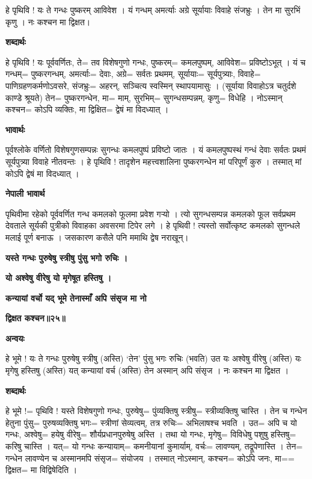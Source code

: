 \documentclass[11pt, a5paper]{article}
\begin{document}
हे पृथिवि ! यः ते गन्धः पुष्करम् आविवेश । यं गन्धम् अमर्त्याः अग्रे सूर्यायाः विवाहे संजभ्रुः । तेन मा सुरभिं कृणु । नः कश्चन मा द्विक्षत।

\textbf{शब्दार्थः}

हे पृथिवि ! यः पूर्ववर्णितः, ते= तव विशेषगुणो गन्धः, पुष्करम्= कमलपुष्पम्, आविवेश= प्रविष्टोऽभूत् । यं च गन्धम्= पुष्करगन्धम्, अमर्त्याः= देवाः, अग्रे= सर्वतः प्रथमम्, सूर्यायाः= सूर्यपुत्र्याः, विवाहे= पाणिग्रहणकर्मणोऽवसरे, संजभ्रुः= अहरन्, सञ्चित्य स्वस्मिन् स्थापयामासुः । (सूर्याया विवाहोऽत्र चतुर्दशे काण्डे श्रूयते) तेन= पुष्करगन्धेन, मा= माम्, सुरभिम्= सुगन्धसम्पन्नम्, कृणु= विधेहि । नोऽस्मान् कश्चन= कोऽपि व्यक्तिः, मा द्विक्षित= द्वेषं मा विदध्यात् ।

\textbf{भावार्थः}

पूर्वश्लोके वर्णितो विशेषगुणसम्पन्नः सुगन्धः कमलपुष्पं प्रविष्टो जातः । यं कमलपुष्पस्थं गन्धं देवाः सर्वतः प्रथमं सूर्यपुत्र्या विवाहे नीतवन्तः । हे पृथिवि ! तादृशेन महत्त्वशालिना पुष्करगन्धेन मां परिपूर्णं कुरु । तस्मात् मां कोऽपि द्वेषं मा विदध्यात् ।

\textbf{नेपाली भावार्थ}

पृथिवीमा रहेको पूर्ववर्णित गन्ध कमलको फूलमा प्रवेश गर्‍यो । त्यो सुगन्धसम्पन्न कमलको फूल सर्वप्रथम देवताले सूर्यकी पुत्रीको विवाहका अवसरमा टिपेर लगे । हे पृथिवी ! त्यस्तो सर्वोत्कृष्ट कमलको सुगन्धले मलाई पूर्ण बनाऊ । जसकारण कसैले पनि ममाथि द्वेष नराखून्।

\textbf{यस्ते गन्धः पुरुषेषु स्त्रीषु पुंसु भगो रुचिः ।}

\textbf{यो अश्वेषु वीरेषु यो मृगेषूत हस्तिषु ।}

\textbf{कन्यायां वर्चो यद् भूमे तेनास्माँ अपि संसृज मा नो}

\textbf{द्विक्षत कश्चन॥२५॥}

\textbf{अन्वयः}

हे भूमे ! यः ते गन्धः पुरुषेषु स्त्रीषु (अस्ति) ‘तेन’ पुंसु भगः रुचिः (भवति)  उत यः अश्वेषु वीरेषु (अस्ति) यः मृगेषु हस्तिषु (अस्ति) यत् कन्यायां वर्च (अस्ति) तेन अस्मान् अपि संसृज । नः कश्चन मा द्विक्षत ।

\textbf{शब्दार्थः}

हे भूमे !‍= पृथिवि ! यस्ते विशेषगुणो गन्धः, पुरुषेषु= पुंव्यक्तिषु स्त्रीषु= स्त्रीव्यक्तिषु चास्ति । तेन च गन्धेन हेतुना पुंसु= पुरुषव्यक्तिषु भगः= स्त्रीणां सेव्यत्वम्, तत्र रुचिः= अभिलाषश्च भवति । उत= अपि च यो गन्धः, अश्वेषु= हयेषु वीरेषु= शौर्यप्रधानपुरुषेषु अस्ति । तथा यो गन्धः, मृगेषु= विविधेषु पशुषु हस्तिषु= करिषु चास्ति । यत्= यो गन्धः कन्यायाम्= कमनीयानां कुमार्याम्, वर्चः= लावण्यम्, तद्रूपेणास्ति । तेन= गन्धेन लावण्येन च अस्मानमपि संसृज= संयोजय । तस्मात् नोऽस्मान्, कश्चन= कोऽपि जनः, मा== द्विक्षत= मा विद्विषेदिति ।
\end{document}
